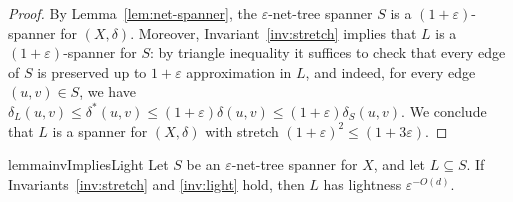 \documentclass[11pt]{article}
\let\e\varepsilon               %
\newcommand{\dist}{\ensuremath{\delta}}
\newcommand{\ddim}{\ensuremath{d}}
\begin{document}
\begin{proof}
    By Lemma~\ref{lem:net-spanner}, the $\e$-net-tree spanner $S$ is a $(1+\e)$-spanner for $(X, \dist)$. Moreover, Invariant~\ref{inv:stretch} implies that $L$ is a $(1+\e)$-spanner for $S$: by triangle inequality it suffices to check that every edge of $S$ is preserved up to $1+\e$ approximation in $L$, and indeed, for every edge $(u,v) \in S$, we have $\dist_L(u,v) \le \dist^*(u,v) \le (1+\e) \dist(u,v) \le (1+\e) \dist_S(u,v)$. We conclude that $L$ is a spanner for $(X,\delta)$ with stretch $(1+\e)^2 \le (1+3\e)$.
\end{proof}
%
%
%
% 
\begin{restatable}{lemma}{invImpliesLight}
\label{lem:inv-implies-light}
Let $S$ be an $\e$-net-tree spanner for $X$, and let $L \subseteq S$. If Invariants~\ref{inv:stretch} and \ref{inv:light} hold, then $L$ has lightness $\e^{-O(\ddim)}$.    
\end{restatable}
%
\end{document}
